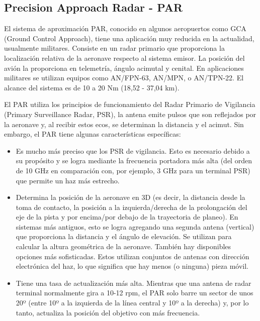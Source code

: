 \subsection{Precision Approach Radar - PAR}
\label{sec:06.sistema.PAR}

El sistema de aproximación PAR, conocido en algunos aeropuertos como GCA (Ground Control
Approach), tiene una aplicación muy reducida en la actualidad, usualmente militares.
Consiste en un radar primario que proporciona la localización relativa de la aeronave respecto al sistema
emisor. La posición del avión la proporciona en telemetría, ángulo acimutal y cenital. En aplicaciones
militares se utilizan equipos como AN/FPN-63, AN/MPN, o AN/TPN-22. El alcance del sistema es
de 10 a 20 Nm (18,52 - 37,04 km).

El PAR utiliza los principios de funcionamiento del  Radar Primario de Vigilancia (Primary Surveillance Radar, PSR), la antena emite pulsos que son reflejados por la aeronave y, al recibir estos ecos, se determinan la distancia y el acimut. Sin embargo, el PAR tiene algunas características específicas:

\begin{itemize}
\item Es mucho más preciso que los PSR de vigilancia. Esto es   necesario debido a su propósito y se logra mediante la frecuencia   portadora más alta (del orden de 10 GHz en comparación con, por   ejemplo, 3 GHz para un terminal PSR) que permite un haz más   estrecho.  
\item Determina la posición de la aeronave en 3D (es decir, la   distancia desde la toma de contacto, la posición a la   izquierda/derecha de la prolongación del eje de la pista y por   encima/por debajo de la trayectoria de planeo). En sistemas más   antiguos, esto se logra agregando una segunda antena (vertical) que   proporciona la distancia y el ángulo de elevación. Se utilizan para calcular la altura geométrica de la   aeronave. También hay disponibles opciones más sofisticadas. Estos   utilizan conjuntos de antenas con dirección electrónica del haz, lo   que significa que hay menos (o ninguna) pieza móvil.  
\item Tiene una tasa   de actualización más alta. Mientras que una antena de radar terminal   normalmente gira a 10-12 rpm, el PAR solo barre un sector de unos 20º (entre 10º a la izquierda de la línea central y 10º a la   derecha) y, por lo tanto, actualiza la posición del objetivo con más   frecuencia.

  \end{itemize}



